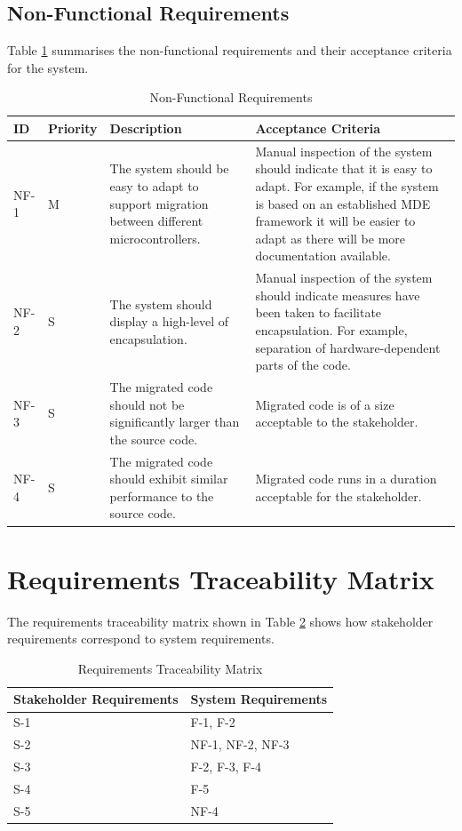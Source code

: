 \documentclass{UoYCSproject}
\newcommand{\ra}[1]{\renewcommand{\arraystretch}{#1}}
\begin{document}
\subsection{Non-Functional Requirements}
Table \ref{table:non_func_req} summarises the non-functional requirements and their acceptance criteria for the system.
\begin{table}[h!]\centering
\caption{Non-Functional Requirements}
\ra{1.3}
  \begin{tabular}{@{}p{}p{}p{}p{}@{}} \toprule 
  \textbf{ID} & \textbf{Priority} & \textbf{Description} & \textbf{Acceptance Criteria} \\
  \midrule
  NF-1 & M & The system should be easy to adapt to support migration between different microcontrollers. & Manual inspection of the system should indicate that it is easy to adapt. For example, if the system is based on an established MDE framework it will be easier to adapt as there will be more documentation available. \\
  NF-2 & S & The system should display a high-level of encapsulation. & Manual inspection of the system should indicate measures have been taken to facilitate encapsulation. For example, separation of hardware-dependent parts of the code. \\
  NF-3 & S & The migrated code should not be significantly larger than the source code. & Migrated code is of a size acceptable to the stakeholder. \\
  NF-4 & S & The migrated code should exhibit similar performance to the source code. & Migrated code runs in a duration acceptable for the stakeholder. \\
  \bottomrule
  \end{tabular}

\label{table:non_func_req}
\end{table}

\newpage
\section{Requirements Traceability Matrix}
The requirements traceability matrix shown in Table \ref{table:traceability} shows how stakeholder requirements correspond to system requirements.
\begin{table}[h!]\centering
\caption{Requirements Traceability Matrix}
\ra{1.3}
  \begin{tabular}{@{}p{}p{}@{}} \toprule 
  \textbf{Stakeholder Requirements} & \textbf{System Requirements} \\
  \midrule
  S-1 & F-1, F-2 \\
  S-2 & NF-1, NF-2, NF-3 \\
  S-3 & F-2, F-3, F-4 \\
  S-4 & F-5 \\
  S-5 & NF-4 \\
  \bottomrule
  \end{tabular}
\label{table:traceability}
\end{table}
\end{document}
